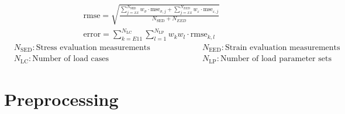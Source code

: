     \begin{center}
        \begin{gather}
             \text{rmse} = \sqrt{\frac{\displaystyle\sum_{j=xx}^{N_\text{SED}} w_{\sigma} \cdot \text{mse}_{\sigma,j} + \displaystyle\sum_{j=xx}^{N_{EED}} w_{\varepsilon} \cdot \text{mse}_{\varepsilon,j}}{N_\text{SED} + N_{\scriptscriptstyle EED}}} \\
            \text{error} = \sum_{k=E11}^{N_\text{LC}} \sum_{l=1}^{N_\text{LP}} w_k w_l \cdot \text{rmse}_{k,l}  
        \end{gather}
        \begin{equation*}
            \begin{split}
                &N_\text{SED}: \text{Stress evaluation measurements}\\
                &N_{\text{LC}}: \text{Number of load cases}
            \end{split}
            \hspace{2cm}
            \begin{split}
                &N_\text{EED}: \text{Strain evaluation measurements}\\
                &N_{\text{LP}}: \text{Number of load parameter sets}
            \end{split}
        \end{equation*}
    \end{center}
    
 
    
    \section{Preprocessing} \label{sec: preprocessing}


